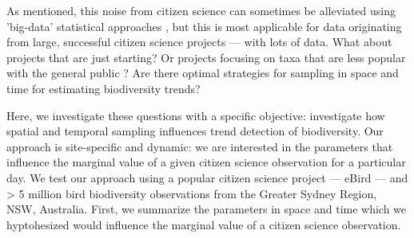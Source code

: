 \documentclass[9pt,twocolumn,twoside,lineno]{pnas-new}
\begin{document}
As mentioned, this noise from citizen science \cite{bird2014statistical} can sometimes be alleviated using 'big-data' statistical approaches \cite{kelling2015taking}, but this is most applicable for data originating from large, successful citizen science projects --- with lots of data. What about projects that are just starting? Or projects focusing on taxa that are less popular with the general public \cite{mair2016explaining, ward2014understanding}? Are there optimal strategies for sampling in space and time for estimating biodiversity trends?

Here, we investigate these questions with a specific objective: investigate how spatial and temporal sampling influences trend detection of biodiversity. Our approach is site-specific and dynamic: we are interested in the parameters that influence the marginal value of a given citizen science observation for a particular day. We test our approach using a popular citizen science project --- eBird \cite{sullivan2009ebird} --- and > 5 million bird biodiversity observations from the Greater Sydney Region, NSW, Australia. First, we summarize the parameters in space and time which we hyptohesized would influence the marginal value of a citizen science observation.
\end{document}
